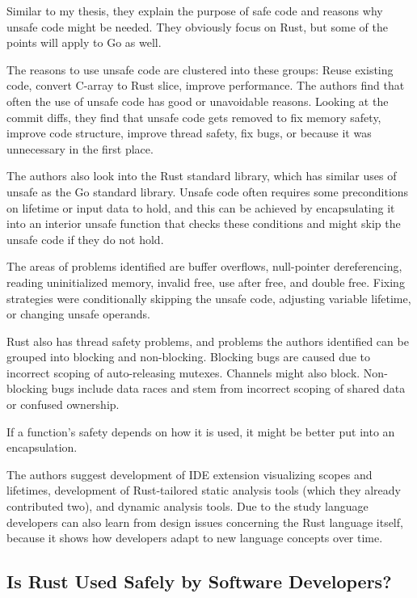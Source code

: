 Similar to my thesis, they explain the purpose of safe code and reasons why unsafe code might be needed.
They obviously focus on Rust, but some of the points will apply to Go as well.

The reasons to use unsafe code are clustered into these groups: Reuse existing code, convert C-array to Rust slice,
improve performance.
The authors find that often the use of unsafe code has good or unavoidable reasons.
Looking at the commit diffs, they find that unsafe code gets removed to fix memory safety, improve code structure,
improve thread safety, fix bugs, or because it was unnecessary in the first place.

The authors also look into the Rust standard library, which has similar uses of unsafe as the Go standard library.
Unsafe code often requires some preconditions on lifetime or input data to hold, and this can be achieved by encapsulating
it into an interior unsafe function that checks these conditions and might skip the unsafe code if they do not hold.

The areas of problems identified are buffer overflows, null-pointer dereferencing, reading uninitialized memory, invalid
free, use after free, and double free.
Fixing strategies were conditionally skipping the unsafe code, adjusting variable lifetime, or changing unsafe operands.

Rust also has thread safety problems, and problems the authors identified can be grouped into blocking and non-blocking.
Blocking bugs are caused due to incorrect scoping of auto-releasing mutexes.
Channels might also block.
Non-blocking bugs include data races and stem from incorrect scoping of shared data or confused ownership.

If a function's safety depends on how it is used, it might be better put into an encapsulation.

The authors suggest development of IDE extension visualizing scopes and lifetimes, development of Rust-tailored static
analysis tools (which they already contributed two), and dynamic analysis tools.
Due to the study language developers can also learn from design issues concerning the Rust language itself, because it
shows how developers adapt to new language concepts over time.



\subsection{Is Rust Used Safely by Software Developers?}
\label{subsec:is-rust-used-safely-by-software-developers?}


